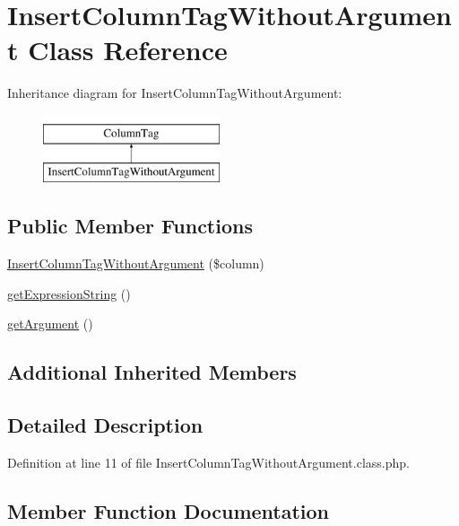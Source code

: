 \hypertarget{classInsertColumnTagWithoutArgument}{}\section{Insert\+Column\+Tag\+Without\+Argument Class Reference}
\label{classInsertColumnTagWithoutArgument}
Inheritance diagram for Insert\+Column\+Tag\+Without\+Argument\+:\begin{figure}[H]
\begin{center}
\leavevmode
\includegraphics[height=2.000000cm]{classInsertColumnTagWithoutArgument}
\end{center}
\end{figure}
\subsection*{Public Member Functions}
\begin{DoxyCompactItemize}
\item 
\hyperlink{classInsertColumnTagWithoutArgument_ae1e10363dd8d24dff6cd05ca7711e455}{Insert\+Column\+Tag\+Without\+Argument} (\$column)
\item 
\hyperlink{classInsertColumnTagWithoutArgument_a0ea3febe1aed5e5f0fd8ac97fb0a8ac6}{get\+Expression\+String} ()
\item 
\hyperlink{classInsertColumnTagWithoutArgument_a728f587b2a45ff2b56c1f883197a3c4c}{get\+Argument} ()
\end{DoxyCompactItemize}
\subsection*{Additional Inherited Members}


\subsection{Detailed Description}


Definition at line 11 of file Insert\+Column\+Tag\+Without\+Argument.\+class.\+php.



\subsection{Member Function Documentation}
\mbox{\label{classInsertColumnTagWithoutArgument_a728f587b2a45ff2b56c1f883197a3c4c}} 
